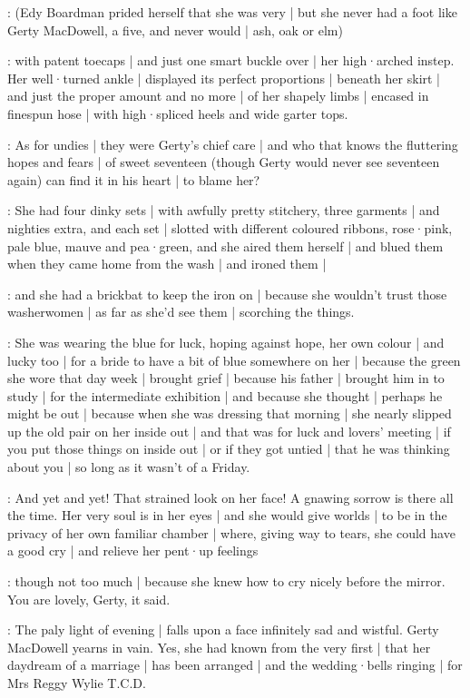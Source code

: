 \gertyJudgy:
(Edy Boardman prided herself that she was very  |
but she never had a foot like Gerty MacDowell,
a five,
and never would |
ash, oak or elm)

\gertyReal:
with patent toecaps |
and just one smart buckle over |
her high·arched instep.
Her well·turned ankle |
displayed its perfect proportions |
beneath her skirt |
and just the proper amount and no more |
of her shapely limbs |
encased in finespun hose |%
with high·spliced heels and wide garter tops.

\Nnovel:
As for undies |
they were Gerty's chief care |
and who that knows the fluttering hopes and fears |
of sweet seventeen
(though Gerty would never see seventeen again)
can find it in his heart |
to blame her?

\gertyReal:
She had four dinky sets |
with awfully pretty stitchery,
three garments |
and nighties extra,
and each set |
slotted with different coloured ribbons,
rose·pink,
pale blue,
mauve
and pea·green,
and she aired them herself |
and blued them
when they came home from the wash |
and ironed them |

\gertyJudgy:
and she had a brickbat to keep the iron on |
because she wouldn't trust those washerwomen |
as far as she'd see them |
scorching the things.

\gertyRomantic:
She was wearing the blue for luck,
hoping against hope,%
her own colour |
and lucky too |
for a bride to have a bit of blue somewhere on her |
because the green she wore that day week |
brought grief |
because his father |
brought him in to study |
for the intermediate exhibition |
and because she thought |
perhaps he might be out |
because when she was dressing that morning |
she nearly slipped up the old pair on her inside out |
and that was for luck and lovers' meeting |
if you put those things on inside out |
or if they got untied |
that he was thinking about you |
so long as it wasn't of a Friday.

\gertyNovel:
And yet and yet!
That strained look on her face!
A gnawing sorrow is there all the time.
Her very soul is in her eyes |
and she would give worlds |
to be in the privacy of her own familiar chamber |
where,
giving way to tears,
she could have a good cry |
and relieve her pent·up feelings

\gertyReal:
though not too much |
because she knew how to cry nicely before the mirror.
You are lovely,
Gerty,
it said.

\gertyNovel:
The paly light of evening |
falls upon a face infinitely sad and wistful.
Gerty MacDowell yearns in vain.
Yes,
she had known from the very first |
that her daydream of a marriage |
has been arranged |
and the wedding·bells ringing |
for Mrs Reggy Wylie T.C.D.

